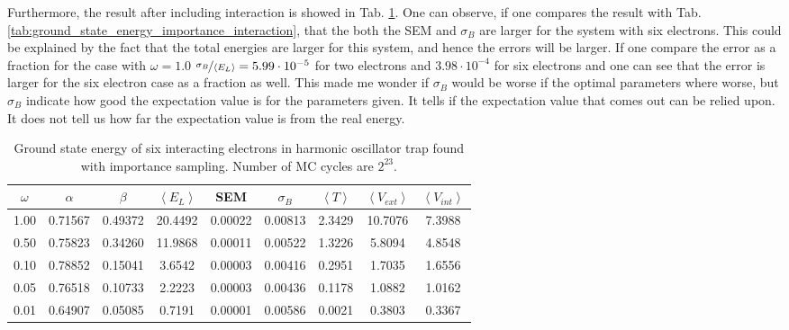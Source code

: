 Furthermore, the result after including interaction is showed in Tab. \ref{tab:ground_state_energy_importance_interaction_6p}. One can observe, if one compares the result with Tab. \ref{tab:ground_state_energy_importance_interaction}, that the both the SEM and $\sigma_B$ are larger for the system with six electrons. This could be explained by the fact that the total energies are larger for this system, and hence the errors will be larger. If one compare the error as a fraction for the case with $\omega = 1.0$ $\nicefrac{\sigma_B}{\left< E_L \right>} = 5.99 \cdot 10^{-5}$ for two electrons and $3.98\cdot 10^{-4}$ for six electrons and one can see that the error is larger for the six electron case as a fraction as well. This made me wonder if $\sigma_B$ would be worse if the optimal parameters where worse, but $\sigma_B$ indicate how good the expectation value is for the parameters given. It tells if the expectation value that comes out can be relied upon. It does not tell us how far the expectation value is from the real energy.

\begin{table}[H]\caption{Ground state energy of six interacting electrons in harmonic oscillator trap found with importance sampling. Number of MC cycles are $2^{23}$.}\label{tab:ground_state_energy_importance_interaction_6p}
\center
\begin{tabular}{c|cccccccc}
$\omega$ & $\alpha$ & $\beta$ & $\left< E_L \right>$ & SEM & $\sigma_B$ &  $\left< T \right>$  & $\left< V_{ext}\right>$ & $\left<V_{int} \right>$  \\ \hline
1.00 & 0.71567 & 0.49372 & 20.4492 & 0.00022 & 0.00813 & 2.3429 & 10.7076 & 7.3988\\
0.50 & 0.75823 & 0.34260 & 11.9868 & 0.00011 & 0.00522 & 1.3226 & 5.8094 & 4.8548\\
0.10 & 0.78852 & 0.15041 & 3.6542 & 0.00003 & 0.00416 & 0.2951 & 1.7035 & 1.6556\\
0.05 & 0.76518 & 0.10733 & 2.2223 & 0.00003 & 0.00436 &  0.1178 & 1.0882 & 1.0162\\
0.01 & 0.64907 & 0.05085 & 0.7191 & 0.00001 & 0.00586 & 0.0021 & 0.3803 & 0.3367\\
\end{tabular}
\end{table}


